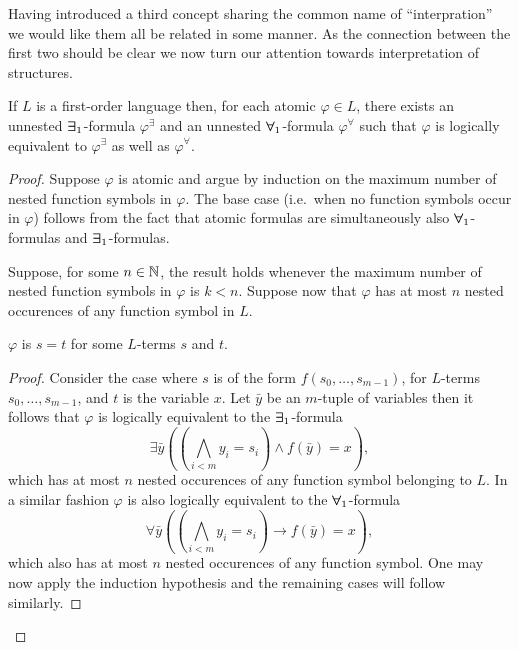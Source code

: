 Having introduced a third concept sharing the common name of ``interpration'' we would like them all be related in some manner.  As the connection between the first two should be clear we now turn our attention towards interpretation of structures.

\begin{prp}\label{prp:unnest}
	If $L$ is a first-order language then, for each atomic $\varphi\in L$, there exists an unnested $\bm{\exists}_{1}$-formula $\varphi^\exists$ and an unnested $\bm{\forall}_{1}$-formula $\varphi^\forall$ such that $\varphi$ is logically equivalent to $\varphi^\exists$ as well as $\varphi^\forall$.
\end{prp}
\begin{proof}
	Suppose $\varphi$ is atomic and argue by induction on the maximum number of nested function symbols in $\varphi$.  The base case (i.e.\ when no function symbols occur in $\varphi$) follows from the fact that atomic formulas are simultaneously also $\bm{\forall}_{1}$-formulas and $\bm{\exists}_{1}$-formulas.

	Suppose, for some $n\in\mathbb{N}$, the result holds whenever the maximum number of nested function symbols in $\varphi$ is $k<n$.  Suppose now that $\varphi$ has at most $n$ nested occurences of any function symbol in $L$.
	\begin{case}
		$\varphi$ is $s=t$ for some $L$-terms $s$ and $t$.
	\end{case}
	\begin{proof}
		Consider the case where $s$ is of the form $f(s_0,\dotsc,s_{m-1})$, for $L$-terms $s_0,\dotsc,s_{m-1}$, and $t$ is the variable $x$.  Let $\bar{y}$ be an $m$-tuple of variables then it follows that $\varphi$ is logically equivalent to the $\bm{\exists}_{1}$-formula
		\begin{equation}
			\exists\bar{y}\left(\left(\bigwedge_{i<m}y_i=s_i\right)\wedge f(\bar{y})=x\right),
		\end{equation}
		which has at most $n$ nested occurences of any function symbol belonging to $L$.  In a similar fashion $\varphi$ is also logically equivalent to the $\bm{\forall}_{1}$-formula
		\begin{equation}
			\forall\bar{y}\left(\left(\bigwedge_{i<m}y_i=s_i\right)\rightarrow f(\bar{y})=x\right),
		\end{equation}
		which also has at most $n$ nested occurences of any function symbol.  One may now apply the induction hypothesis and the remaining cases will follow similarly.
	\end{proof}


\end{proof}
